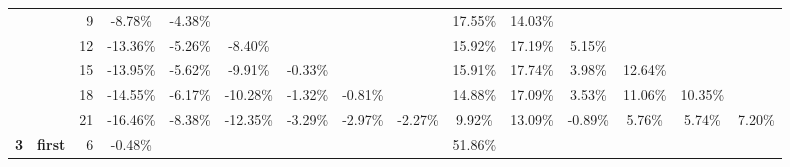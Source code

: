 \begin{table}[t]
{\begin{tabular}{ccrcccccccccccc}
          & \textcolor[rgb]{ .502,  .502,  .502}{} & 9     & \cellcolor[rgb]{ .98,  .8,  .812}-8.78\% & \cellcolor[rgb]{ .984,  .894,  .906}-4.38\% &       &       &       &       & \cellcolor[rgb]{ .796,  .851,  .933}17.55\% & \cellcolor[rgb]{ .835,  .882,  .949}14.03\% &       &       &       &  \\
          & \textcolor[rgb]{ .502,  .502,  .502}{} & 12    & \cellcolor[rgb]{ .98,  .706,  .714}-13.36\% & \cellcolor[rgb]{ .984,  .875,  .886}-5.26\% & \cellcolor[rgb]{ .98,  .812,  .82}-8.40\% &       &       &       & \cellcolor[rgb]{ .812,  .867,  .941}15.92\% & \cellcolor[rgb]{ .8,  .855,  .933}17.19\% & \cellcolor[rgb]{ .933,  .949,  .98}5.15\% &       &       &  \\
          & \textcolor[rgb]{ .502,  .502,  .502}{} & 15    & \cellcolor[rgb]{ .976,  .694,  .702}-13.95\% & \cellcolor[rgb]{ .984,  .867,  .878}-5.62\% & \cellcolor[rgb]{ .98,  .776,  .788}-9.91\% & \cellcolor[rgb]{ .984,  .98,  .992}-0.33\% &       &       & \cellcolor[rgb]{ .812,  .867,  .941}15.91\% & \cellcolor[rgb]{ .792,  .851,  .933}17.74\% & \cellcolor[rgb]{ .945,  .961,  .988}3.98\% & \cellcolor[rgb]{ .851,  .89,  .953}12.64\% &       &  \\
          & \textcolor[rgb]{ .502,  .502,  .502}{} & 18    & \cellcolor[rgb]{ .976,  .682,  .69}-14.55\% & \cellcolor[rgb]{ .984,  .855,  .867}-6.17\% & \cellcolor[rgb]{ .98,  .769,  .78}-10.28\% & \cellcolor[rgb]{ .984,  .957,  .969}-1.32\% & \cellcolor[rgb]{ .984,  .969,  .98}-0.81\% &       & \cellcolor[rgb]{ .824,  .875,  .945}14.88\% & \cellcolor[rgb]{ .8,  .855,  .933}17.09\% & \cellcolor[rgb]{ .953,  .961,  .988}3.53\% & \cellcolor[rgb]{ .867,  .902,  .957}11.06\% & \cellcolor[rgb]{ .875,  .91,  .961}10.35\% &  \\
          & \textcolor[rgb]{ .502,  .502,  .502}{} & 21    & \cellcolor[rgb]{ .976,  .639,  .651}-16.46\% & \cellcolor[rgb]{ .98,  .812,  .82}-8.38\% & \cellcolor[rgb]{ .98,  .725,  .737}-12.35\% & \cellcolor[rgb]{ .984,  .918,  .929}-3.29\% & \cellcolor[rgb]{ .984,  .925,  .933}-2.97\% & \cellcolor[rgb]{ .984,  .937,  .949}-2.27\% & \cellcolor[rgb]{ .878,  .914,  .965}9.92\% & \cellcolor[rgb]{ .843,  .886,  .949}13.09\% & \cellcolor[rgb]{ .984,  .969,  .98}-0.89\% & \cellcolor[rgb]{ .925,  .945,  .98}5.76\% & \cellcolor[rgb]{ .925,  .945,  .98}5.74\% & \cellcolor[rgb]{ .91,  .933,  .973}7.20\% \\
    \cmidrule(r){1-3}
    \textbf{3} & \multicolumn{1}{l}{\textcolor[rgb]{ .502,  .502,  .502}{\textbf{first}}} & 6     & \cellcolor[rgb]{ .984,  .976,  .988}-0.48\% &       &       &       &       &       & \cellcolor[rgb]{ .412,  .584,  .8}51.86\% &       &       &       &       &  \\

\end{tabular}}
\end{table}

